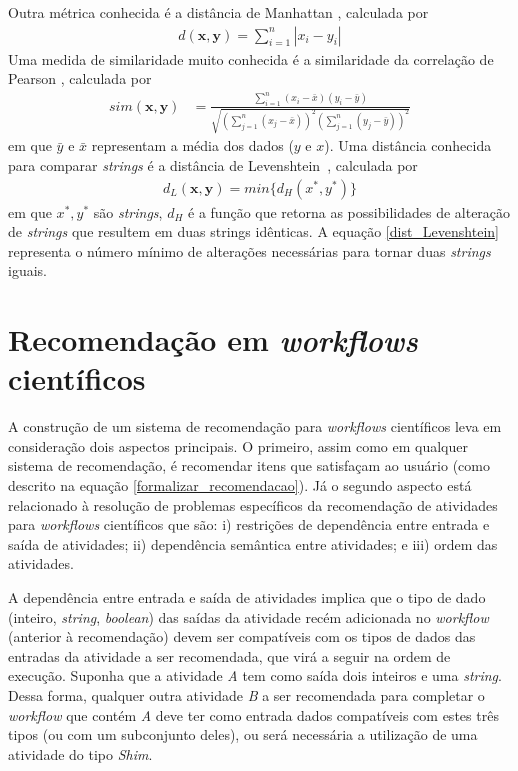 Outra métrica conhecida é a distância de Manhattan \cite{Deza2009}, calculada por
\begin{align}
d(\mathbf{x},\mathbf{y}) = \sum\limits_{i=1}^{n} |x_{i} - y_{i}|\label{dist_manhattan}
\end{align}
Uma medida de similaridade muito conhecida é a similaridade da correlação de Pearson \cite{Deza2009}, calculada por
\begin{align}
sim(\mathbf{x},\mathbf{y}) &= \frac{\sum\limits_{i=1}^{n} (x_{i}-\bar{x})(y_{i} - \bar{y})}
{\sqrt{ \left( \sum\limits_{j=1}^{n}(x_{j}-\bar{x}) \right) ^{2} \left( \sum\limits_{j=1}^{n}(y_{j}-\bar{y})\right)^{2}} } \label{similaridade_pearson}
\end{align}
em que \(\bar{y}\) e \(\bar{x}\) representam a média dos dados (\(y\) e \(x\)). Uma distância conhecida para comparar \emph{strings} é a distância de Levenshtein~\cite{Deza2009}, calculada por
\begin{align}
d_{L}(\mathbf{x},\mathbf{y}) = min\{d_{H}(x^{*}, y^{*})\} \label{dist_Levenshtein}
\end{align}
em que \(x^{*}, y^{*}\) são \emph{strings}, \(d_{H}\) é a função que retorna as possibilidades de alteração de \emph{strings} que resultem em duas strings idênticas. A equação \eqref{dist_Levenshtein} representa o número mínimo de alterações necessárias para tornar duas \emph{strings} iguais.

\section{Recomendação em \emph{workflows} científicos}\label{SEC_RECOMENDACAO_WORKFLOW_CIENTIFICO}
A construção de um sistema de recomendação para \emph{workflows} científicos leva em consideração dois aspectos principais. O primeiro, assim como em qualquer sistema de recomendação, é recomendar itens que satisfaçam ao usuário (como descrito na equação \eqref{formalizar_recomendacao}). Já o segundo aspecto está relacionado à resolução de problemas específicos da recomendação de atividades para \emph{workflows} científicos que são: i) restrições de dependência entre entrada e saída de atividades; ii) dependência semântica entre atividades; e iii) ordem das atividades.

A dependência entre entrada e saída de atividades implica que o tipo de dado (inteiro, \emph{string}, \emph{boolean}) das saídas da atividade recém adicionada no \emph{workflow} (anterior à recomendação) devem ser compatíveis com os tipos de dados das entradas da atividade a ser recomendada, que virá a seguir na ordem de execução. Suponha que a atividade \emph{A} tem como saída dois inteiros e uma \emph{string}. Dessa forma, qualquer outra atividade \emph{B} a ser recomendada para completar o \emph{workflow} que contém \emph{A} deve ter como entrada dados compatíveis com estes três tipos (ou com um subconjunto deles), ou será necessária a utilização de uma atividade do tipo \emph{Shim}.

